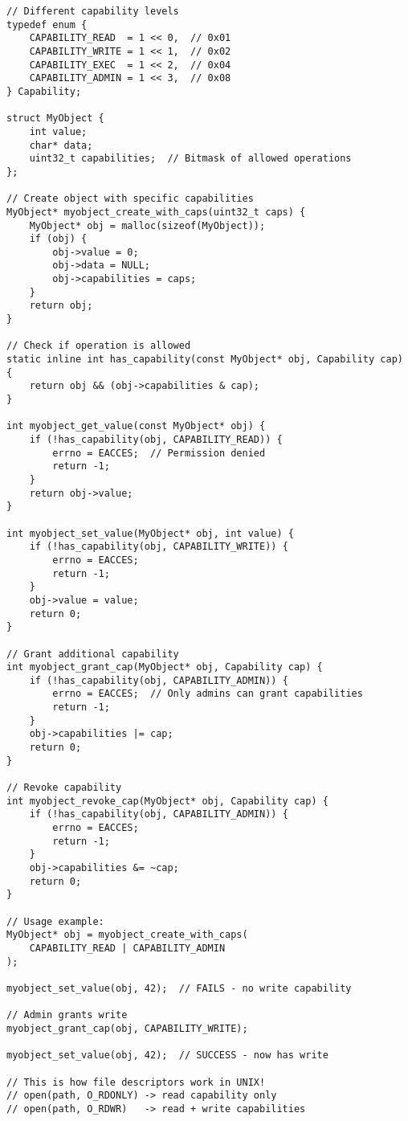\begin{lstlisting}
// Different capability levels
typedef enum {
    CAPABILITY_READ  = 1 << 0,  // 0x01
    CAPABILITY_WRITE = 1 << 1,  // 0x02
    CAPABILITY_EXEC  = 1 << 2,  // 0x04
    CAPABILITY_ADMIN = 1 << 3,  // 0x08
} Capability;

struct MyObject {
    int value;
    char* data;
    uint32_t capabilities;  // Bitmask of allowed operations
};

// Create object with specific capabilities
MyObject* myobject_create_with_caps(uint32_t caps) {
    MyObject* obj = malloc(sizeof(MyObject));
    if (obj) {
        obj->value = 0;
        obj->data = NULL;
        obj->capabilities = caps;
    }
    return obj;
}

// Check if operation is allowed
static inline int has_capability(const MyObject* obj, Capability cap) {
    return obj && (obj->capabilities & cap);
}

int myobject_get_value(const MyObject* obj) {
    if (!has_capability(obj, CAPABILITY_READ)) {
        errno = EACCES;  // Permission denied
        return -1;
    }
    return obj->value;
}

int myobject_set_value(MyObject* obj, int value) {
    if (!has_capability(obj, CAPABILITY_WRITE)) {
        errno = EACCES;
        return -1;
    }
    obj->value = value;
    return 0;
}

// Grant additional capability
int myobject_grant_cap(MyObject* obj, Capability cap) {
    if (!has_capability(obj, CAPABILITY_ADMIN)) {
        errno = EACCES;  // Only admins can grant capabilities
        return -1;
    }
    obj->capabilities |= cap;
    return 0;
}

// Revoke capability
int myobject_revoke_cap(MyObject* obj, Capability cap) {
    if (!has_capability(obj, CAPABILITY_ADMIN)) {
        errno = EACCES;
        return -1;
    }
    obj->capabilities &= ~cap;
    return 0;
}

// Usage example:
MyObject* obj = myobject_create_with_caps(
    CAPABILITY_READ | CAPABILITY_ADMIN
);

myobject_set_value(obj, 42);  // FAILS - no write capability

// Admin grants write
myobject_grant_cap(obj, CAPABILITY_WRITE);

myobject_set_value(obj, 42);  // SUCCESS - now has write

// This is how file descriptors work in UNIX!
// open(path, O_RDONLY) -> read capability only
// open(path, O_RDWR)   -> read + write capabilities
\end{lstlisting}

